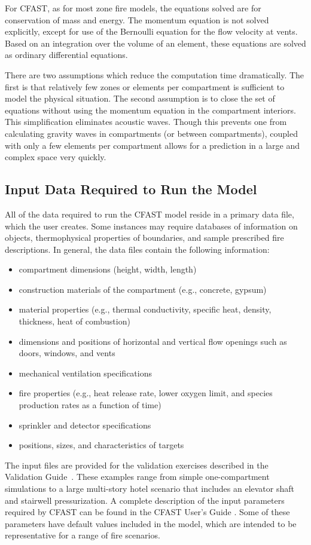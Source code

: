 For CFAST, as for most zone fire models, the equations solved are for conservation of mass and energy. The momentum equation is not solved explicitly, except for use of the Bernoulli equation for the flow velocity at vents. Based on an integration over the volume of an element, these equations are solved as ordinary differential equations.

There are two assumptions which reduce the computation time dramatically. The first is that relatively few zones or elements per compartment is sufficient to model the physical situation. The second assumption is to close the set of equations without using the momentum equation in the compartment interiors. This simplification eliminates acoustic waves. Though this prevents one from calculating gravity waves in compartments (or between compartments), coupled with only a few elements per compartment allows for a prediction in a large and complex space very quickly.



\subsection{Input Data Required to Run the Model}

All of the data required to run the CFAST model reside in a primary data file, which the user creates.  Some instances may require databases of information on objects, thermophysical properties of boundaries, and sample prescribed fire descriptions.  In general, the data files contain the following information:
\begin{itemize}
\item compartment dimensions (height, width, length)
\item construction materials of the compartment (e.g., concrete, gypsum)
\item material properties (e.g., thermal conductivity, specific heat, density, thickness, heat of combustion)
\item dimensions and positions of horizontal and vertical flow openings such as doors, windows, and vents
\item mechanical ventilation specifications
\item fire properties (e.g., heat release rate, lower oxygen limit, and species production rates as a function of time)
\item sprinkler and detector specifications
\item positions, sizes, and characteristics of targets
\end{itemize}
The input files are provided for the validation exercises described in the Validation Guide~\cite{CFAST_Valid_Guide_6}. These examples range from simple one-compartment simulations to a large multi-story hotel scenario that includes an elevator shaft and stairwell pressurization. A complete description of the input parameters required by CFAST can be found in the CFAST User's Guide \cite{CFAST_Users_Guide_6}. Some of these parameters have default values included in the model, which are intended to be representative for a range of fire scenarios.


